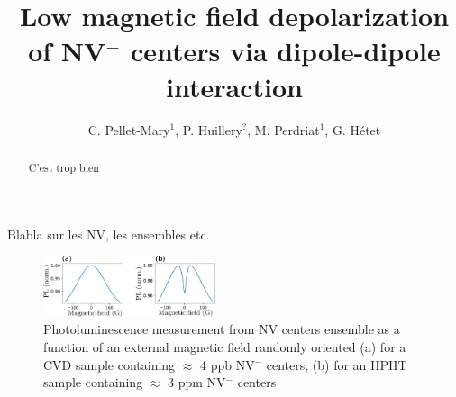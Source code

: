 \documentclass[preprintnumbers,amsmath,amssymb,superscriptaddress,twocolumn,showpacs]{revtex4-2}
\begin{document}
\title{Low magnetic field depolarization of NV$^-$ centers via dipole-dipole interaction}

\author{C. Pellet-Mary$^1$, P. Huillery$^?$,  M. Perdriat$^1$, G. H\'etet} 


\begin{abstract}
C'est trop bien
\end{abstract}

\maketitle
Blabla sur les NV, les ensembles etc.




\begin{figure}
\includegraphics[width=0.45\textwidth]{Figures/fig dense vs pas dense}
\caption{Photoluminescence measurement from NV centers ensemble as a function of an external magnetic field randomly oriented (a) for a CVD sample containing $\approx$ 4 ppb NV$^-$ centers, (b) for an HPHT sample containing $\approx$ 3 ppm NV$^-$ centers}
\label{PL_NV_density}
\end{figure}

%
\end{document}
